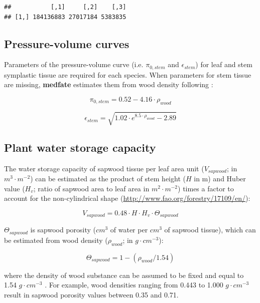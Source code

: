 \documentclass[]{book}
\begin{document}
\begin{verbatim}
##           [,1]     [,2]    [,3]
## [1,] 184136883 27017184 5383835
\end{verbatim}

\subsection{Pressure-volume curves}\label{pressure-volume-curves-1}

Parameters of the pressure-volume curve (i.e. \(\pi_{0,stem}\) and
\(\epsilon_{stem}\)) for leaf and stem symplastic tissue are required
for each species. When parameters for stem tissue are missing,
\textbf{medfate} estimates them from wood density following
\citet{Christoffersen2016}:

\begin{equation}
\pi_{0,stem} = 0.52 - 4.16 \cdot \rho_{wood}
\end{equation}

\begin{equation}
\epsilon_{stem} = \sqrt{1.02 \cdot e^{8.5\cdot \rho_{wood}}-2.89}
\end{equation}

\subsection{Plant water storage
capacity}\label{plant-water-storage-capacity}

The water storage capacity of sapwood tissue per leaf area unit
(\(V_{sapwood}\); in \(m^3 \cdot m^{-2}\)) can be estimated as the
product of stem height (\(H\) in m) and Huber value (\(H_v\); ratio of
sapwood area to leaf area in \(m^2 \cdot m^{-2}\)) times a factor to
account for the non-cylindrical shape
(\url{http://www.fao.org/forestry/17109/en/}):

\begin{equation}
V_{sapwood} = 0.48 \cdot H \cdot H_v \cdot \Theta_{sapwood}
\end{equation}

\(\Theta_{sapwood}\) is sapwood porosity (\(cm^3\) of water per \(cm^3\)
of sapwood tissue), which can be estimated from wood density
(\(\rho_{wood}\); in \(g \cdot cm^{-3}\)):

\begin{equation}
\Theta_{sapwood} = 1 - (\rho_{wood} / 1.54)
\end{equation}

where the density of wood substance can be assumed to be fixed and equal
to 1.54 \(g \cdot cm^{-3}\) \citep{Dunlap1914}. For example, wood
densities ranging from 0.443 to 1.000 \(g \cdot cm^{-3}\) result in
sapwood porosity values between 0.35 and 0.71.
\end{document}
